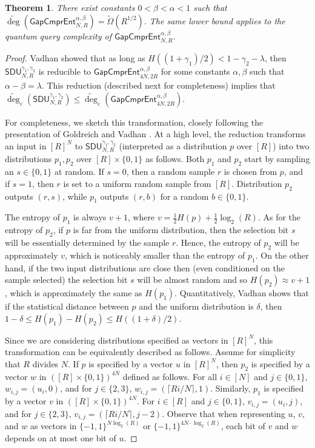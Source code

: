\documentclass[11pt, letterpaper, fleqn]{article}
\newtheorem{theorem}{Theorem}
\theoremstyle{plain}
\newcommand{\SDU}{\mathsf{ SDU}}
\newcommand{\bits}{\{-1,1\}}
\newcommand{\eps}{\varepsilon}
\newcommand{\adeg}{\widetilde{\operatorname{deg}}}
\begin{document}
\begin{theorem} \label{entropysucks} There exist constants $0 < \beta < \alpha < 1$ such that $\adeg(\mathsf{GapCmprEnt}^{\alpha, \beta}_{N, R}) = \tilde{\Omega}(R^{1/2}).$ The same lower bound applies to the quantum query complexity of 
$\mathsf{GapCmprEnt}^{\alpha, \beta}_{N, R}$.\end{theorem}
\begin{proof}
Vadhan \cite[Claim 4.4.2 and Remark 4.4.3]{vadhan} showed that as long as $H( (1+\gamma_1)/2) < 1-\gamma_2 - \lambda$, 
then $\SDU_{N, R}^{\gamma_1, \gamma_2}$ is reducible
to $\mathsf{GapCmprEnt}^{\alpha, \beta}_{4N, 2R}$ for some constants $\alpha, \beta$
such that $\alpha-\beta=\lambda$. 
This reduction (described next for completeness) implies that $\adeg_{\eps}(\SDU_{N, R}^{\gamma_1, \gamma_2}) \leq 
\adeg_{\eps}(\mathsf{GapCmprEnt}^{\alpha, \beta}_{4N, 2R})$.



For completeness,
we sketch this transformation, closely following
the presentation of Goldreich and Vadhan \cite{goldreichvadhansurvey}.
At a high level, the reduction transforms
an input in $[R]^N$ to $\SDU_{N, R}^{\gamma_1, \gamma_2}$ (interpreted as a distribution $p$ over $[R]$) into
two distributions $p_1, p_2$ over $[R] \times \{0, 1\}$ as follows.
Both $p_1$ and $p_2$ start by sampling an $s \in \{0, 1\}$ at random. If $s=0$, then a random sample $r$ is chosen from $p$, 
and if $s=1$, then $r$ is set to a uniform random sample from $[R]$. Distribution $p_2$ outputs $(r, s)$, while $p_1$ outputs $(r, b)$ for a random $b \in \{0, 1\}$. 

The entropy of $p_1$
is always $v + 1$, where $v=\frac{1}{2} H(p) + \frac{1}{2} \log_2(R)$. 
As for the entropy of $p_2$, if $p$ is far from the uniform distribution, then the selection bit $s$ will be essentially determined by the sample $r$. Hence,
the entropy of $p_2$ will be approximately $v$, which is noticeably smaller than
the entropy of $p_1$. On the other hand, if the two input distributions are close then
(even conditioned on the sample selected) the selection bit $s$ will be almost
random and so $H(p_2) \approx v+1$, which is approximately the same as $H(p_1)$.
Quantitatively, Vadhan \cite{vadhan} shows that if the statistical distance between $p$ and the uniform distribution is $\delta$,
then $1-\delta \leq H(p_1) - H(p_2) \leq H( (1+\delta)/2)$.

Since we are considering distributions specified as vectors in $[R]^N$, this transformation
can be equivalently described as follows. Assume for simplicity that $R$ divides $N$. 
If $p$ is specified by a vector $u$ in $[R]^N$, then $p_2$ is specified by a vector $w$ in $([R]\times\{0,1\})^{4N}$ defined as follows. For all $i \in [N]$ and $j \in \{0, 1\}$, $w_{i, j}=(u_i, 0)$, and for $j \in \{2, 3\}$, $w_{i, j}=(\lceil Ri/N\rceil, 1)$. Similarly, 
$p_1$ is specified by a vector $v$ in $([R]\times\{0,1\})^{4N}$. For $i \in [R]$ and $j \in \{0, 1\}$, $v_{i, j}=(u_i, j)$, and for $j \in \{2, 3\}$, $v_{i, j} = (\lceil Ri/N\rceil, j-2)$. 
Observe that when representing $u$, $v$, and $w$ as vectors in $\bits^{N \log_2(R)}$
or $\bits^{4N \cdot \log_2(R)}$, each bit of $v$ and $w$ depends on at most one bit of $u$.  


\end{proof}
\end{document}
